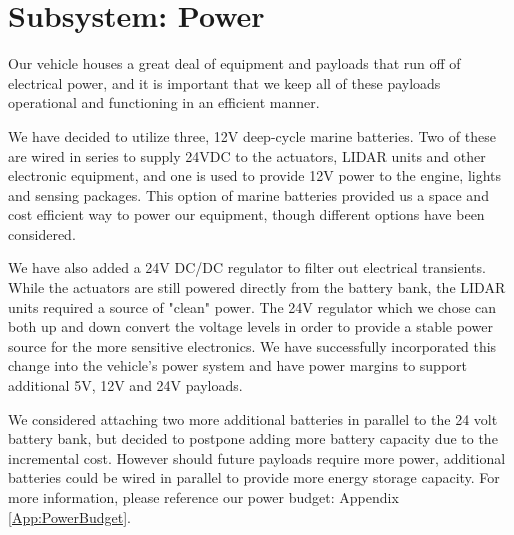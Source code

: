 \chapter{Subsystem: Power}

Our vehicle houses a great deal of equipment and payloads that run off of electrical power, and it is important that we keep all of these payloads operational and functioning in an efficient manner.

We have decided to utilize three, 12V deep-cycle marine batteries. Two of these are wired in series to supply 24VDC to the actuators, LIDAR units and other electronic equipment, and one is used to provide 12V power to the engine, lights and sensing packages. This option of marine batteries provided us a space and cost efficient way to power our equipment, though different options have been considered.

We have also added a 24V DC/DC regulator to filter out electrical transients. While the actuators are still powered directly from the battery bank, the LIDAR units required a source of "clean" power. The 24V regulator which we chose  can both up and down convert the voltage levels in order to provide a stable power source for the more sensitive electronics. We have successfully incorporated this change into the vehicle's power system and have power margins to support additional 5V, 12V and 24V payloads.

We considered attaching two more additional batteries in parallel to the 24 volt battery bank, but decided to postpone adding more battery capacity due to the incremental cost. However should future payloads require more power, additional batteries could be wired in parallel to provide more energy storage capacity. For more information, please reference our power budget: Appendix \ref{App:PowerBudget}.